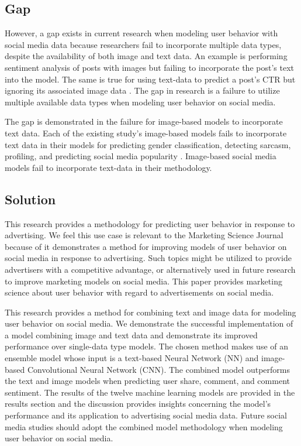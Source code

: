 \documentclass[mksc,blindrev]{informs3} %
\begin{document}
\subsection{Gap}

However, a gap exists in current research when modeling user behavior with social media data because researchers fail to incorporate multiple data types, despite the availability of both image and text data. An example is performing sentiment analysis of posts with images \cite{Wang2015} but failing to incorporate the post's text into the model. The same is true for using text-data to predict a post's CTR but ignoring its associated image data \cite{Li2015}. The gap in research is a failure to utilize multiple available data types when modeling user behavior on social media.

The gap is demonstrated in the failure for image-based models to incorporate text data. Each of the existing study's image-based models fails to incorporate text data in their models for predicting gender classification, detecting sarcasm, profiling, and predicting social media popularity \cite{Hassner2015, Poria2016, Segalin2017, Gelli2015}. Image-based social media models fail to incorporate text-data in their methodology.

\subsection{Solution}

This research provides a methodology for predicting user behavior in response to advertising. We feel this use case is relevant to the Marketing Science Journal because of it demonstrates a method for improving models of user behavior on social media in response to advertising. Such topics might be utilized to provide advertisers with a competitive advantage, or alternatively used in future research to improve marketing models on social media. This paper provides marketing science about user behavior with regard to advertisements on social media.
  
This research provides a method for combining text and image data for modeling user behavior on social media. We demonstrate the successful implementation of a model combining image and text data and demonstrate its improved performance over single-data type models. The chosen method makes use of an ensemble model whose input is a text-based Neural Network (NN) and image-based Convolutional Neural Network (CNN). The combined model outperforms the text and image models when predicting user share, comment, and comment sentiment. The results of the twelve machine learning models are provided in the results section and the discussion provides insights concerning the model's performance and its application to advertising social media data. Future social media studies should adopt the combined model methodology when modeling user behavior on social media.
\end{document}
